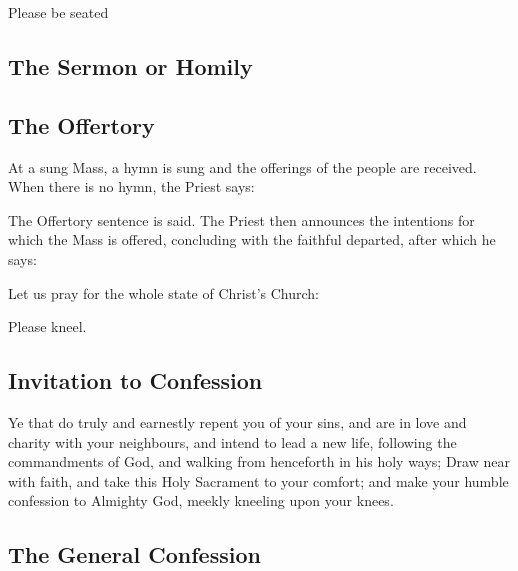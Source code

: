 \begin{rubric}
Please be seated
\end{rubric}

\subsection{The Sermon or Homily}

\subsection{The Offertory}

\begin{rubric}
At a sung Mass, a hymn is sung and the offerings of the people are received.
When there is no hymn, the Priest says:
\end{rubric}
\begin{rubric}
The Offertory sentence is said.
The Priest then announces the intentions for which the Mass is offered,
concluding with the faithful departed, after which he says:
\end{rubric}

Let us pray for the whole state of Christ's Church:
\begin{rubric}
Please kneel.
\end{rubric}

\newpage

\subsection{Invitation to Confession}

Ye that do truly and earnestly repent you of your sins, and are in love and charity
with your neighbours, and intend to lead a new life, following the
commandments of God, and walking from henceforth in his holy ways; Draw
near with faith, and take this Holy Sacrament to your comfort; and make your
humble confession to Almighty God, meekly kneeling upon your knees.

\subsection{The General Confession}

